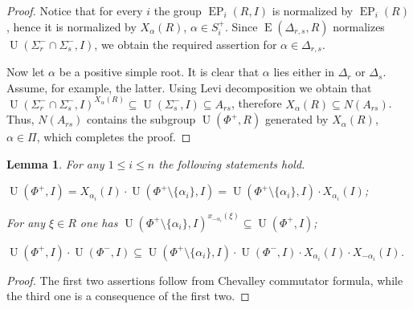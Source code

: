 \documentclass[11pt]{amsart}
\theoremstyle{plain}
\numberwithin{equation}{section}
\newtheorem{lemma}{Lemma}
\numberwithin{lemma}{section}
\theoremstyle{definition}
\theoremstyle{remark}
\DeclareMathOperator{\E}{E}
\DeclareMathOperator{\EP}{EP}
\DeclareMathOperator{\U}{U}
\begin{document}
\begin{proof}
Notice that for every $i$ the group $\EP_i(R, I)$ is normalized by $\EP_i(R)$, hence it is normalized by $X_\alpha(R)$, $\alpha \in S_i^+$.
Since $\E(\Delta_{r, s}, R)$ normalizes $\U(\Sigma_r^- \cap \Sigma_s^-, I)$, we obtain the required assertion for $\alpha \in \Delta_{r, s}$.

Now let $\alpha$ be a positive simple root. It is clear that $\alpha$ lies either in $\Delta_r$ or $\Delta_s$.
Assume, for example, the latter. Using Levi decomposition we obtain that $\U(\Sigma_r^- \cap \Sigma_s^-, I)^{X_\alpha(R)} \subseteq \U(\Sigma_s^-, I) \subseteq A_{rs}$, therefore $X_{\alpha}(R) \subseteq N(A_{rs})$.
Thus, $N(A_{rs})$ contains the subgroup $\U(\Phi^+, R)$ generated by $X_{\alpha}(R)$, $\alpha\in\Pi$, which completes the proof.
\end{proof}

\begin{lemma}\label{lemma:dv_unipotent} For any $1\leq i\leq n$ the following statements hold. 
\begin{thmlist} \item \label{item-dvu1} $\U(\Phi^+, I) = X_{\alpha_{i}}(I)\cdot \U(\Phi^+\setminus\{\alpha_{i}\}, I) = \U(\Phi^+\setminus\{\alpha_{i}\}, I)\cdot X_{\alpha_{i}}(I)$;
\item \label{item-dvu2} For any $\xi\in R$ one has $\U(\Phi^+\setminus\{\alpha_i\}, I)^{x_{-\alpha_{i}}(\xi)} \subseteq \U(\Phi^+, I)$;
\item \label{item-dvu3} $\U(\Phi^+, I)\cdot \U(\Phi^-, I) \subseteq \U(\Phi^+\setminus \{\alpha_i\}, I) \cdot \U(\Phi^-, I) \cdot X_{\alpha_{i}}(I) \cdot X_{-\alpha_{i}}(I)$.
\end{thmlist} \end{lemma}
\begin{proof} The first two assertions follow from Chevalley commutator formula, while the third one is a consequence of the first two. \end{proof}
\end{document}
